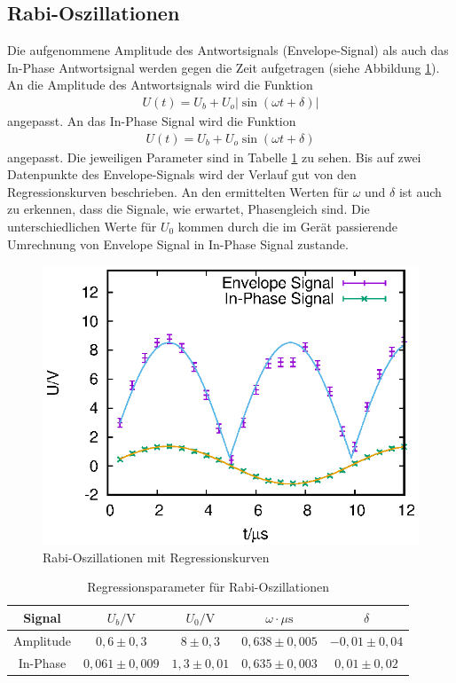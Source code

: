 \subsection{Rabi-Oszillationen}
Die aufgenommene Amplitude des Antwortsignals (Envelope-Signal) als auch das In-Phase Antwortsignal werden gegen die Zeit aufgetragen (siehe Abbildung \ref{fig:rabi}). An die Amplitude des Antwortsignals wird die Funktion
\begin{align*}
  U(t)=U_b+U_o|\sin(\omega t+\delta)|
\end{align*}
angepasst. An das In-Phase Signal wird die Funktion
\begin{align*}
  U(t)=U_b+U_o\sin(\omega t+\delta)
\end{align*}
angepasst. Die jeweiligen Parameter sind in Tabelle \ref{tab:rabi} zu sehen. Bis auf zwei Datenpunkte des Envelope-Signals wird der Verlauf gut von den Regressionskurven beschrieben. An den ermittelten Werten für $\omega$ und $\delta$ ist auch zu erkennen, dass die Signale, wie erwartet, Phasengleich sind. Die unterschiedlichen Werte für $U_0$ kommen durch die im Gerät passierende Umrechnung von Envelope Signal in In-Phase Signal zustande.

\begin{figure}[h]
  \centering
  \includegraphics[width=0.75 \linewidth]{data/p402_443_data/rabi_f_1/rabi_1.eps}
  \caption{Rabi-Oszillationen mit Regressionskurven}
  \label{fig:rabi}
\end{figure}

\begin{table}[h]
  \centering
  \begin{tabular}{c c c c c}
    \toprule
    Signal & $U_b/\mathrm{V}$ & $U_0/\mathrm{V}$ & $\omega \cdot \mu\mathrm{s}$ & $\delta$ \\
    \midrule
    Amplitude & $0,6 \pm 0,3$ & $8 \pm 0,3$ & $0,638 \pm 0,005$ & $-0,01 \pm 0,04$ \\
    In-Phase & $0,061 \pm 0,009$ & $1,3 \pm 0,01$& $0,635 \pm 0,003$ & $0,01 \pm 0,02$ \\
    \bottomrule
  \end{tabular}
  \caption{Regressionsparameter für Rabi-Oszillationen}
  \label{tab:rabi}
\end{table}

